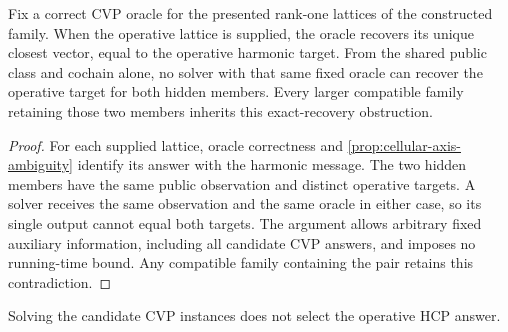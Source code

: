 \begin{corollary}
  \label{cor:lattice-member-separation}
  Fix a correct CVP oracle for the presented rank-one lattices of the
  constructed family. When the operative lattice is supplied, the oracle
  recovers its unique closest vector, equal to the operative harmonic target.
  From the shared public class and cochain alone, no solver with that same
  fixed oracle can recover the operative target for both hidden members.
  Every larger compatible family retaining those two members inherits this
  exact-recovery obstruction.
\end{corollary}

\begin{proof}
  For each supplied lattice, oracle correctness and
  \cref{prop:cellular-axis-ambiguity} identify its answer with the harmonic
  message. The two hidden members have the same public observation and
  distinct operative targets. A solver receives the same observation and
  the same oracle in either case, so its single output cannot equal both
  targets. The argument allows arbitrary fixed auxiliary information,
  including all candidate CVP answers, and imposes no running-time bound.
  Any compatible family containing the pair retains this contradiction.
\end{proof}

Solving the candidate CVP instances does not select the operative HCP answer.
